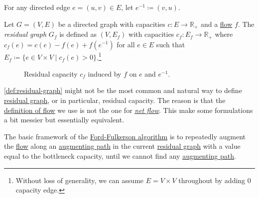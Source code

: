 \begin{notation}
	For any directed edge \(e = (u, v) \in E\), let \(e^{-1} \coloneqq (v, u)\).
\end{notation}

\begin{definition}\label{def:residual-graph}
	Let \(G = (V, E)\) be a directed graph with capacities \(c \colon E \to \mathbb{R} _{+}\) and a \hyperref[def:flow]{flow} \(f\). The \emph{residual graph} \(G_f\) is defined as \((V, E_f )\) with capacities \(c_f \colon E_f \to \mathbb{R} _{+}\) where \(c_f (e) = c(e) - f(e) + f(e^{-1} )\) for all \(e \in E\) such that \(E_f \coloneqq \{ e \in V \times V \mid c_f(e) > 0 \} \).\footnote{Without loss of generality, we can assume \(E = V \times V\) throughout by adding \(0\) capacity edge.}
\end{definition}

\begin{figure}[H]
	\centering
	\caption{Residual capacity \(c_f\) induced by \(f\) on \(e\) and \(e^{-1} \).}
	\label{fig:residual-graph}
\end{figure}

\begin{remark}
	\autoref{def:residual-graph} might not be the most common and natural way to define \hyperref[def:residual-graph]{residual graph}, or in particular, residual capacity. The reason is that the \hyperref[def:flow]{definition of flow} we use is not the one for \href{https://en.wikipedia.org/wiki/Flow_network#Flows}{\emph{net flow}}. This make some formulations a bit messier but essentially equivalent.
\end{remark}

The basic framework of the \hyperref[algo:Ford-Fulkerson]{Ford-Fulkerson algorithm} is to repeatedly augment the \hyperref[def:flow]{flow} along an \hyperref[def:augmenting-path]{augmenting path} in the current \hyperref[def:residual-graph]{residual graph} with a value equal to the bottleneck capacity, until we cannot find any \hyperref[def:augmenting-path]{augmenting path}.


